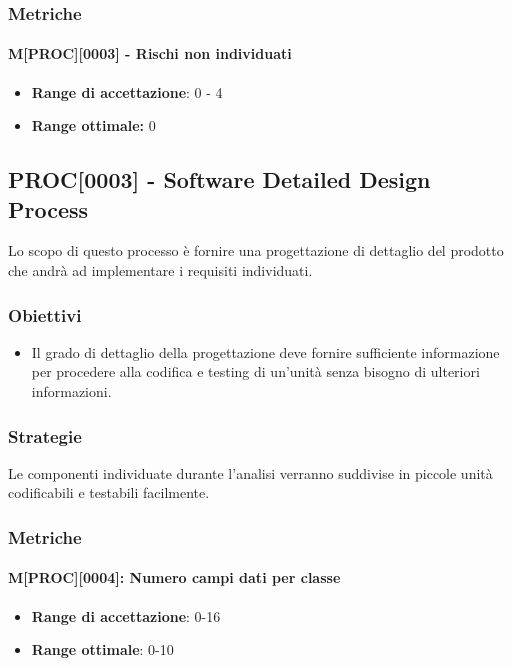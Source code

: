 \subsubsection{Metriche}
\paragraph{M[PROC][0003] - Rischi non individuati}
\begin{itemize}
    \item \textbf{Range di accettazione}: 0 - 4
    \item \textbf{Range ottimale:} 0
\end{itemize}

\subsection{PROC[0003] - Software Detailed Design Process}
Lo scopo di questo processo è fornire una progettazione di dettaglio del prodotto che andrà ad implementare i requisiti individuati.

\subsubsection{Obiettivi}
\begin{itemize}
    \item Il grado di dettaglio della progettazione deve fornire sufficiente informazione per procedere alla codifica e testing di un'unità senza bisogno di ulteriori informazioni.
\end{itemize}

\subsubsection{Strategie}
Le componenti individuate durante l'analisi verranno suddivise in piccole unità codificabili e testabili facilmente.

\subsubsection{Metriche}

    \paragraph{M[PROC][0004]: Numero campi dati per classe}
\begin{itemize}
    \item \textbf{Range di accettazione}: 0-16
    \item \textbf{Range ottimale}: 0-10
\end{itemize}

